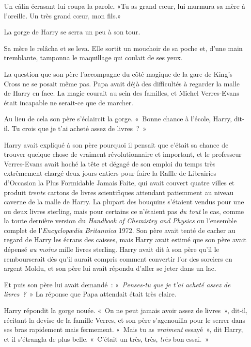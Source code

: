 Un câlin écrasant lui coupa la parole. «Tu as grand cœur, lui murmura sa mère à l'oreille. Un très grand cœur, mon fils.»

La gorge de Harry se serra un peu à son tour.

Sa mère le relâcha et se leva. Elle sortit un mouchoir de sa poche et, d'une main tremblante, tamponna le maquillage qui coulait de ses yeux.

La question que son père l'accompagne du côté magique de la gare de King's Cross ne se posait même pas.
Papa avait déjà des difficultés à regarder la malle de Harry en face.
La magie courait au sein des familles, et Michel Verres-Evans était incapable ne serait-ce que de marcher.

Au lieu de cela son père s'éclaircit la gorge.
«~Bonne chance à l'école, Harry, dit-il. Tu crois que je t'ai acheté assez de livres~?~»

Harry avait expliqué à son père pourquoi il pensait que c'était sa chance de trouver quelque chose de vraiment révolutionnaire et important, et le professeur Verres-Evans avait hoché la tête et dégagé de son emploi du temps très extrêmement chargé deux jours entiers pour faire la Raffle de Librairies d'Occasion la Plus Formidable Jamais Faite, qui avait couvert quatre villes et produit \emph{trente} cartons de livres scientifiques attendant patiemment au niveau caverne de la malle de Harry.
La plupart des bouquins s'étaient vendus pour une ou deux livres sterling, mais pour certains ce n'étaient pas \emph{du tout} le cas, comme la toute dernière version du \emph{Handbook of Chemistry and Physics} ou l'ensemble complet de l'\emph{Encyclop\ae dia Britannica} 1972.
Son père avait tenté de cacher au regard de Harry les écrans des caisses,
mais Harry avait estimé que son père avait dépensé \emph{au moins} mille livres sterling.
Harry avait dit à son père qu'il le rembourserait dès qu'il aurait compris comment convertir l'or des sorciers en argent Moldu, et son père lui avait répondu d'aller se jeter dans un lac.

Et puis son père lui avait demandé~: «~\emph{Penses-tu que je t'ai acheté assez de livres~?}~» La réponse que Papa attendait était très claire.

Harry répondit la gorge nouée. «~On ne peut jamais avoir assez de livres~», dit-il, récitant la devise de la famille Verres, et son père s'agenouilla pour le serrer dans ses bras rapidement mais fermement. «~Mais tu as \emph{vraiment} essayé~», dit Harry, et il s'étrangla de plus belle. «~C'était un très, très, \emph{très} bon essai.~»

